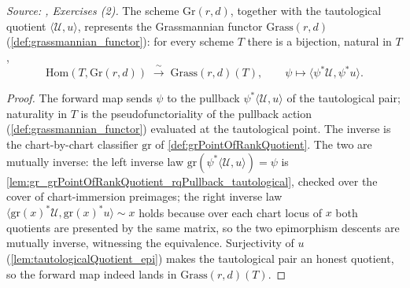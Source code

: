 \begin{theorem}\leanok
  \label{thm:grassmannian_universal_property}
  \textit{Source: \cite{nitsure-hilbert-quot}, Exercises (2).}
  The scheme \(\mathrm{Gr}(r,d)\), together with the tautological quotient
  \(\langle \mathcal{U}, u\rangle\), represents the Grassmannian functor
  \(\mathrm{Grass}(r,d)\) (\cref{def:grassmannian_functor}): for every scheme \(T\) there is a
  bijection, natural in \(T\),
  \[
    \mathrm{Hom}(T, \mathrm{Gr}(r,d)) \;\xrightarrow{\ \sim\ }\; \mathrm{Grass}(r,d)(T),
    \qquad \psi \longmapsto \langle \psi^{*}\mathcal{U}, \psi^{*}u\rangle .
  \]
\end{theorem}
\begin{proof}
  The forward map sends \(\psi\) to the pullback \(\psi^{*}\langle\mathcal{U},u\rangle\) of the
  tautological pair; naturality in \(T\) is the pseudofunctoriality of the pullback action
  (\cref{def:grassmannian_functor}) evaluated at the tautological point. The inverse is the
  chart-by-chart classifier \(\mathrm{gr}\) of \cref{def:grPointOfRankQuotient}. The two are
  mutually inverse: the left inverse law
  \(\mathrm{gr}(\psi^{*}\langle\mathcal{U},u\rangle) = \psi\) is
  \cref{lem:gr_grPointOfRankQuotient_rqPullback_tautological}, checked over the cover of
  chart-immersion preimages; the right inverse law
  \(\langle\mathrm{gr}(x)^{*}\mathcal{U}, \mathrm{gr}(x)^{*}u\rangle \sim x\) holds because over
  each chart locus of \(x\) both quotients are presented by the same matrix, so the two
  epimorphism descents are mutually inverse, witnessing the equivalence. Surjectivity of \(u\)
  (\cref{lem:tautologicalQuotient_epi}) makes the tautological pair an honest quotient, so the
  forward map indeed lands in \(\mathrm{Grass}(r,d)(T)\).
\end{proof}
